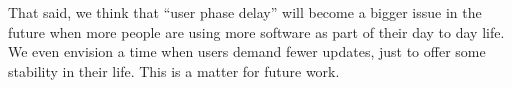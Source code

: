 \documentclass{sig-alternate}
\newcommand{\fig}[1]{Figure~\ref{fig:#1}}
\begin{document}
That said,  
we think that ``user phase delay'' will become a bigger issue in the future when more people are using more software as part of their day to day life. We even envision a time when users demand fewer updates, just to offer some stability in their life. This is a matter for future work.

 


\end{document}
